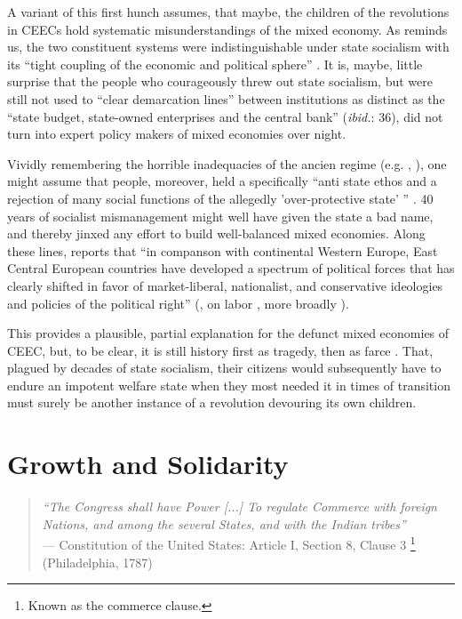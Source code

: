 \documentclass[11pt,a4paper,oneside,openright]{article}
\begin{document}
A variant of this first hunch assumes, that maybe, the children of the revolutions in \glspl{CEEC} hold systematic misunderstandings of the mixed economy. 
As \citeauthor{Bonker2006} reminds us, the two constituent systems were indistinguishable under state socialism with its ``tight coupling of the economic and political sphere'' \citeyearpar[35]{Bonker2006}. 
It is, maybe, little surprise that the people who courageously threw out state socialism, but were still not used to ``clear demarcation lines'' between institutions as distinct as the ``state budget, state-owned enterprises and the central bank'' (\emph{ibid.}: 36), did not turn into expert policy makers of mixed economies over night.

Vividly remembering the horrible inadequacies of the ancien regime (e.g. \citealt{Szikra2009}, \citealt{Millard1992}), one might assume that people, moreover, held a specifically  ``anti state ethos and a rejection of many social functions of the allegedly 'over-protective state' '' \citep[130]{Millard1992}. 
40 years of socialist mismanagement might well have given the state a bad name, and thereby jinxed any effort to build well-balanced mixed economies. 
Along these lines, \citeauthor{Inglot2008} reports that ``in companson with continental Western Europe, East Central European countries have developed a spectrum of political forces that has clearly shifted in favor of market-liberal, nationalist, and conservative ideologies and policies of the political right'' (\citeyear[212]{Inglot2008}, on labor \citealt{Crowley2002}, more broadly \citealt{OrenOuto2001}).

This provides a plausible, partial explanation for the defunct mixed economies of \gls{CEEC}, but, to be clear, it is still history first as tragedy, then as farce \citep{Marx1852}. 
That, plagued by decades of state socialism, their citizens would subsequently have to endure an impotent welfare state when they most needed it in times of transition must surely be another instance of a revolution devouring its own children.

\section{Growth and Solidarity} \label{sec:growth-solidarity}

\begin{quote}
	\emph{``The Congress shall have Power [...] To regulate Commerce with foreign Nations, and among the several States, and with the Indian tribes''}\\
	--- Constitution of the United States: Article I, Section 8, Clause 3
	\footnote{
		Known as the commerce clause.
	} 
	(Philadelphia, 1787)
\end{quote}
\end{document}
